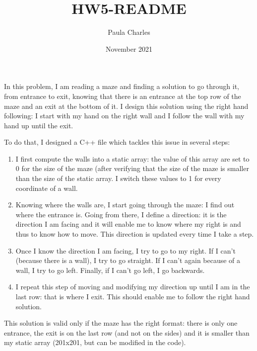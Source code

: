\documentclass{article}
\title{HW5-README}
\author{Paula Charles}
\date{November 2021}
\begin{document}
\maketitle
\noindent
In this problem, I am reading a maze and finding
 a solution to go through it, from entrance to 
exit, knowing that there is an entrance at the 
top row of the maze 
and an exit at the bottom of it.
 I design this solution using the right hand
 following: I start with my hand on the right wall
 and I follow the wall with my hand up until the 
exit.
\newline

\noindent
To do that, I designed a C++ file which tackles 
this issue in several steps:
\begin{enumerate}
    \item I first compute the walls into a static
 array: the value of this array are set to 0 for 
the size of the maze (after verifying that the 
size of the maze is smaller than the size of the 
static array. I switch these values to 1 for every
 coordinate of a wall.
    \item Knowing where the walls are, I start going
 through the maze: I find out where the entrance is.
 Going from there, I define a direction: it is the 
direction I am facing and it will enable me to know 
where my right is and thus to know how to move. This
 direction is updated every time I take a step.
    \item Once I know the direction I am facing, I 
try to go to my right. If I can't (because there is 
a wall), I try to go straight. If I can't again 
because of a wall, I try to go left. Finally, if 
I can't go left, I go backwards.
    \item I repeat this step of moving and modifying
 my direction up until I am in the last row: that is
 where I exit. This should enable me to follow the 
right hand solution.
\end{enumerate}
\newline

\noindent
This solution is valid only if the maze has the right 
format: there is only one entrance, the exit is on 
the last row (and not on the sides) and it is smaller
 than my static array (201x201, but can be modified in
 the code).
\newline
\end{document}
